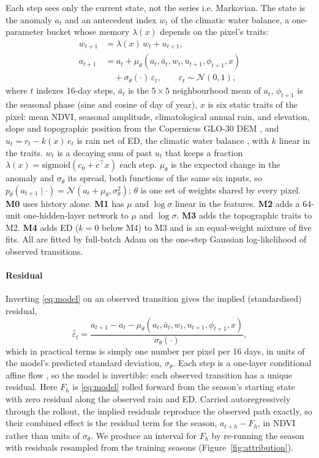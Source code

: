 \documentclass[letterpaper]{article} %
\begin{document}
Each step sees only the current state, not the series i.e. Markovian. The state is the anomaly $a_t$ and an antecedent index $w_t$ of the climatic water balance, a one-parameter bucket whose memory $\lambda(x)$ depends on the pixel's traits:
\begin{align}
w_{t+1} &= \lambda(x)\,w_t + u_{t+1}, \nonumber\\
a_{t+1} &= a_t + \mu_\theta(a_t, \bar a_t, w_t, u_{t+1}, \phi_{t+1}, x) \nonumber\\
&\quad + \sigma_\theta(\cdot)\,\varepsilon_t,\qquad \varepsilon_t\sim\mathcal N(0,1),
\label{eq:model}
\end{align}
where $t$ indexes 16-day steps, $\bar a_t$ is the $5\times5$ neighbourhood mean of $a_t$, $\phi_{t+1}$ is the seasonal phase (sine and cosine of day of year), $x$ is six static traits of the pixel: mean NDVI, seasonal amplitude, climatological annual rain, and elevation, slope and topographic position from the Copernicus GLO-30 DEM \citep{copdem}, and $u_t=r_t-k(x)\,e_t$ is rain net of ED, the climatic water balance \citep{spei}, with $k$ linear in the traits. $w_t$ is a decaying sum of past $u_t$ that keeps a fraction $\lambda(x)=\mathrm{sigmoid}(c_0+c^\top x)$ each step. $\mu_\theta$ is the expected change in the anomaly and $\sigma_\theta$ its spread, both functions of the same six inputs, so $p_\theta(a_{t+1}\mid\cdot)=\mathcal N(a_t+\mu_\theta,\sigma_\theta^2)$; $\theta$ is one set of weights shared by every pixel. \textbf{M0} uses history alone. \textbf{M1} has $\mu$ and $\log\sigma$ linear in the features. \textbf{M2} adds a 64-unit one-hidden-layer network to $\mu$ and $\log\sigma$. \textbf{M3} adds the topographic traits to M2. \textbf{M4} adds ED ($k=0$ below M4) to M3 and is an equal-weight mixture of five fits. All are fitted by full-batch Adam on the one-step Gaussian log-likelihood of observed transitions.

\paragraph{Residual} Inverting \eqref{eq:model} on an observed transition gives the implied (standardised) residual,
\begin{equation}
\hat\varepsilon_t = \frac{a_{t+1} - a_t - \mu_\theta(a_t,\bar a_t,w_t,u_{t+1},\phi_{t+1},x)}{\sigma_\theta(\cdot)},
\label{eq:implied}
\end{equation}
which in practical terms is simply one number per pixel per 16 days, in units of the model's predicted standard deviation, $\sigma_\theta$. Each step is a one-layer conditional affine flow \citep{papamakarios2021}, so the model is invertible: each observed transition has a unique residual. Here $F_h$ is \eqref{eq:model} rolled forward from the season's starting state with zero residual along the observed rain and ED. Carried autoregressively through the rollout, the implied residuals reproduce the observed path exactly, so their combined effect is the residual term for the season, $a_{t+h}-F_h$, in NDVI rather than units of $\sigma_\theta$. We produce an interval for $F_h$ by re-running the season with residuals resampled from the training seasons (Figure~\ref{fig:attribution}). 
\end{document}
